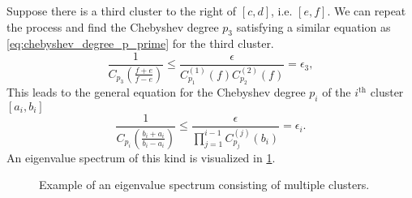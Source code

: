 Suppose there is a third cluster to the right of $[c,d]$, i.e. $[e,f]$. We can repeat the process and find the Chebyshev degree $p_3$ satisfying a similar equation as \cref{eq:chebyshev_degree_p_prime} for the third cluster.
\[
    \frac{1}{C_{p_3}\left(\frac{f+e}{f-e}\right)} \leq \frac{\epsilon}{C^{(1)}_{p_1}(f)C^{(2)}_{p_2}(f)} = \epsilon_3,
\]
This leads to the general equation for the Chebyshev degree $p_i$ of the $i^{\text{th}}$ cluster $[a_i, b_i]$
\begin{equation}
    \frac{1}{C_{p_i}\left(\frac{b_i + a_i}{b_i - a_i}\right)} \leq \frac{\epsilon}{\prod_{j=1}^{i-1} C^{(j)}_{p_j}(b_i)} = \epsilon_i.
    \label{eq:chebyshev_degree_p_i}
\end{equation}
An eigenvalue spectrum of this kind is visualized in \cref{fig:multiple_eigenvalue_clusters}.
\begin{figure}[H]
    \centering
    
    \caption{Example of an eigenvalue spectrum consisting of multiple clusters.}
    \label{fig:multiple_eigenvalue_clusters}
\end{figure}

